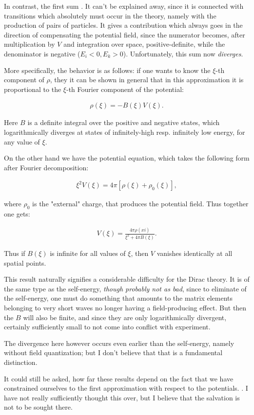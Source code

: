\documentclass{article}
\newcommand{\uequ}[1]{
\begin{align*}
#1
\end{align*}
}
\begin{document}
In contrast, the first sum . It can't be explained away, since it is connected with transitions which absolutely must occur in the theory, namely with the production of pairs of particles. It gives a contribution which always goes in the direction of compensating the potential field, since the numerator becomes, after multiplication by $V$ and integration over space, positive-definite, while the denominator is negative ($E_i < 0, E_k > 0$). Unfortunately, this sum now \textit{diverges}.

More specifically, the behavior is as follows: if one wants to know the $\xi$-th component of $\rho$, they it can be shown in general that in this approximation it is proportional to the $\xi$-th Fourier component of the potential:
\uequ{
\rho(\xi) = -B(\xi)V(\xi).
}
Here $B$ is a definite integral over the positive and negative states, which logarithmically diverges at states of infinitely-high resp. infinitely low energy, for any value of $\xi$.

On the other hand we have the potential equation, which takes the following form after Fourier decomposition:
\uequ{
\xi^2 V(\xi) = 4\pi[\rho(\xi) + \rho_0(\xi)],
}
where $\rho_0$ is the "external" charge, that produces the potential field. Thus together one gets:
\uequ{
V(\xi) = \frac{4\pi\rho(xi)}{\xi^2 + 4\pi B(\xi)}.
}
Thus if $B(\xi)$ is infinite for all values of $\xi$, then $V$ vanishes identically at all spatial points.

This result naturally signifies a considerable difficulty for the Dirac theory. It is of the same type as the self-energy, \textit{though probably not as bad}, since to eliminate of the self-energy, one must do something that amounts to the matrix elements belonging to very short waves no longer having a field-producing effect. But then the $B$ will also be finite, and since they are only logarithmically divergent, certainly sufficiently small to not come into conflict with experiment.

The divergence here however occurs even earlier than the self-energy, namely without field quantization; but I don't believe that that is a fundamental distinction.

It could still be asked, how far these results depend on the fact that we have constrained ourselves to the first approximation with respect to the potentials. . I have not really sufficiently thought this over, but I believe that the salvation is not to be sought there.
\end{document}
